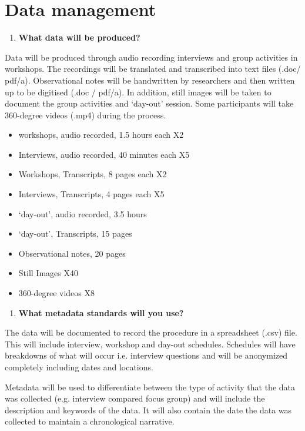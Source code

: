 \section{Data management}
\label{app:DataManagement}
\begin{enumerate}
    \item \textbf{What data will be produced?}
\end{enumerate}	
Data will be produced through audio recording interviews and group activities in workshops. The recordings will be translated and transcribed into text files (.doc/ pdf/a). Observational notes will be handwritten by researchers and then written up to be digitised (.doc / pdf/a). In addition, still images will be taken to document the group activities and ‘day-out’ session. Some participants will take 360-degree videos (.mp4) during the process.

\begin{itemize}
    \item workshops, audio recorded, 1.5 hours each X2
    \item Interviews, audio recorded, 40 minutes each X5
    \item Workshops, Transcripts, 8 pages each X2
    \item Interviews, Transcripts, 4 pages each X5
    \item ‘day-out’, audio recorded, 3.5 hours 
    \item ‘day-out’, Transcripts, 15 pages 
    \item Observational notes, 20 pages
    \item Still Images X40
    \item 360-degree videos X8
\end{itemize}

\begin{enumerate}[resume]
\item \textbf{What metadata standards will you use?} 
\end{enumerate}
The data will be documented to record the procedure in a spreadsheet (.csv) file. This will include interview, workshop and day-out schedules. Schedules will have breakdowns of what will occur i.e. interview questions and will be anonymized completely including dates and locations. 

Metadata will be used to differentiate between the type of activity that the data was collected (e.g. interview compared focus group) and will include the description and keywords of the data. It will also contain the date the data was collected to maintain a chronological narrative. 

